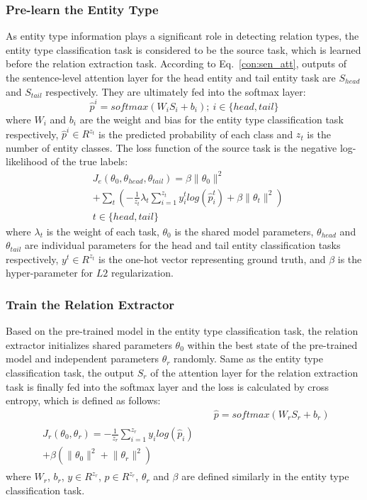\documentclass[11pt,a4paper]{article}
\begin{document}
  \subsubsection*{Pre-learn the Entity Type}
  As entity type information plays a significant role in detecting relation types, the entity type classification task is considered to be the source task, which is learned before the relation extraction task. According to Eq.~\ref{con:sen_att}, outputs of the sentence-level attention layer for the head entity and tail entity task are $S_{head}$ and $S_{tail}$ respectively. They are ultimately fed into the softmax layer:
  \begin{equation}
    \hat{p}^i=softmax(W_iS_i+b_i); \ i\in\{head, tail\}
  \end{equation}
  where $W_i$ and $b_i$ are the weight and bias for the entity type classification task respectively, $\hat{p}^i\in{R^{z_t}}$ is the predicted probability of each class and $z_t$ is the number of entity classes. The loss function of the source task is the negative log-likelihood of the true labels:
  \begin{equation}
    \begin{split}
    &J_e(\theta_0,\theta_{head},\theta_{tail})=\beta\lVert\theta_0\rVert^2\\
    &+\sum_t(-\frac{1}{z_t}\lambda_t\sum_{i=1}^{z_t}y^t_ilog(\hat{p}^t_i)+\beta\lVert\theta_t\rVert^2)\\
    &t\in\{head,tail\}
    \end{split}
  \end{equation}
  where $\lambda_t$ is the weight of each task, $\theta_0$ is the shared model parameters, $\theta_{head}$ and $\theta_{tail}$ are individual parameters for the head and tail entity classification tasks respectively, $y^t\in{R^{z_t}}$ is the one-hot vector representing ground truth, and $\beta$ is the hyper-parameter for $L2$ regularization.
  
  \subsubsection*{Train the Relation Extractor}
  Based on the pre-trained model in the entity type classification task, the relation extractor initializes shared parameters $\theta_0$ within the best state of the pre-trained model and independent parameters $\theta_r$ randomly. Same as the entity type classification task, the output $S_r$ of the attention layer for the relation extraction task is finally fed into the softmax layer and the loss is calculated by cross entropy, which is defined as follows:
  \begin{align}
    &\hat{p}=softmax(W_rS_r+b_r)\\
    \begin{split}
    J_r(\theta_0,\theta_r)=-\frac{1}{z_r}\sum_{i=1}^{z_r}y_ilog(\hat{p}_i)&\\+\beta(\lVert\theta_0\rVert^2+\lVert\theta_r\rVert^2)
    \end{split}
  \end{align}
  where $W_r$, $b_r$, $y\in{R^{z_r}}$, $\hat{p}\in{R^{z_r}}$, $\theta_r$ and $\beta$ are defined similarly in the entity type classification task.
\end{document}
